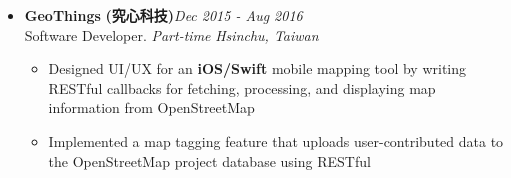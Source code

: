 \begin{itemize}[leftmargin=0pt, label={}]
\item{
{\sectionheading\large{\textbf{GeoThings}}} \textbf{(究心科技)}\hfill {\sectionheading\small{\textit{Dec 2015 - Aug 2016}}}\\
{\sectionheading\small{Software Developer. \textit{Part-time}}}\hfill
{\sectionheading\small{\textit{Hsinchu, Taiwan}}}

    \vspace{-7pt}
    \begin{itemize}[label=\textbullet, leftmargin=*, noitemsep]%
        \item{Designed UI/UX for an \textbf{iOS/Swift} mobile mapping tool by writing RESTful callbacks for fetching, processing, and displaying map information from OpenStreetMap}
        \item{Implemented a map tagging feature that uploads user-contributed data to the OpenStreetMap project database using RESTful}
    \end{itemize}
}
\end{itemize}
